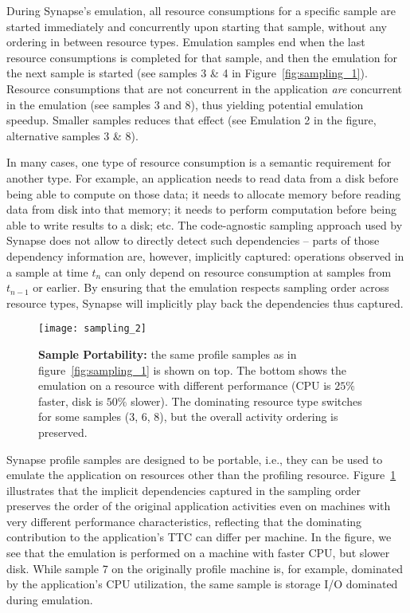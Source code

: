 \documentclass[10pt, conference, compsocconf]{IEEEtran}
\newcommand{\I}[1]{\textit{#1}\xspace}
\newcommand{\synapse}{Synapse\xspace}
\begin{document}
  During \synapse's emulation, all resource consumptions for
  a specific sample are started immediately and concurrently upon
  starting that sample, without any ordering in between resource
  types.  Emulation samples end when the last resource consumptions is
  completed for that sample, and then the emulation for the next
  sample is started (see samples 3 \& 4 in
  Figure~\ref{fig:sampling_1}).  Resource consumptions that are not
  concurrent in the application \I{are} concurrent in the emulation
  (see samples 3 and 8), thus yielding potential emulation speedup.
  Smaller samples reduces that effect (see Emulation 2 in the figure,
  alternative samples 3 \& 8).  
  


  In many cases, one type of resource consumption is a semantic
  requirement for another type.  For example, an application needs to
  read data from a disk before being able to compute on those data; it
  needs to allocate memory before reading data from disk into that memory;
  it needs to perform computation before being able to write results
  to a disk; etc.  The code-agnostic sampling approach used by
  \synapse does not allow to directly detect such dependencies --
  parts of those dependency information are, however, implicitly
  captured: operations observed in a sample at time $t_n$ can only
  depend on resource consumption at samples from $t_{n-1}$ or
  earlier.  By
  ensuring that the emulation respects sampling order across resource
  types, \synapse will implicitly play back the dependencies thus
  captured.

 \begin{figure}[t]
   \centering
   \texttt{[image: sampling\_2]}
   \caption{\textbf{Sample Portability:} the same profile samples as
       in figure~\ref{fig:sampling_1} is shown on top.  The bottom
       shows the emulation on a resource with different performance
       (CPU is $25\%$ faster, disk is $50\%$ slower).  The dominating
       resource type switches for some samples (3, 6, 8), but the
       overall activity ordering is preserved.
     \label{fig:sampling_2} 
   } 
   \end{figure}

  \synapse profile samples are designed to be portable, i.e., they can
  be used to emulate the application on resources other than the
  profiling resource.  Figure~\ref{fig:sampling_2} illustrates that
  the implicit dependencies captured in the sampling order preserves
  the order of the original application activities even on machines
  with very different performance characteristics, reflecting that the
  dominating contribution to the application's TTC can differ per
  machine.  In the figure, we see that the emulation is performed on
  a machine with faster CPU, but slower disk.  While sample 7 on the
  originally profile machine is, for example, dominated by the
  application's CPU utilization, the same sample is storage I/O
  dominated during emulation.
\end{document}
